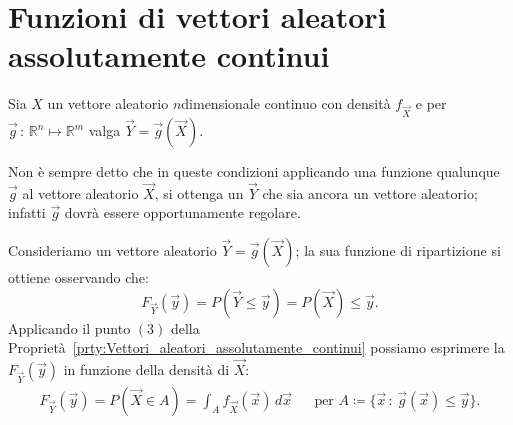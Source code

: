     \section{Funzioni di vettori aleatori assolutamente continui}
        \begin{defn}
            Sia $X$ un vettore aleatorio $n$\nbdash dimensionale continuo con densità $f_{\vec{X}}$ e per $\vec{g}\,:\, \mathbb{R}^n \mapsto \mathbb{R}^m$ valga $\vec{Y} = \vec{g}(\vec{X})$.
            
            Non è sempre detto che in queste condizioni applicando una funzione qualunque $\vec{g}$ al vettore aleatorio $\vec{X}$, si ottenga un $\vec{Y}$ che sia ancora un vettore aleatorio; infatti $\vec{g}$ dovrà essere opportunamente regolare.
        \end{defn}
        \begin{prty}
            Consideriamo un vettore aleatorio $\vec{Y} = \vec{g}(\vec{X})$; la sua funzione di ripartizione si ottiene osservando che: \[
                F_{\vec{Y}}(\vec{y}) = P(\vec{Y} \leq \vec{y}) = P(\vec{X}) \leq \vec{y}
            .\] Applicando il punto $(3)$ della Proprietà~\ref{prty:Vettori_aleatori_assolutamente_continui} possiamo esprimere la $F_{\vec{Y}}(\vec{y})$ in funzione della densità di $\vec{X}$:
            \begin{align}\label{eq:Ripartizione_funzione_continua}
                F_{\vec{Y}}(\vec{y}) = P(\vec{X} \in A) = \int_{A} f_{\vec{X}}(\vec{x})\, d\vec{x} & &
                \text{per } A \coloneqq \{\vec{x} \,:\, \vec{g}(\vec{x}) \leq \vec{y}\}
            .\end{align}
        \end{prty}
